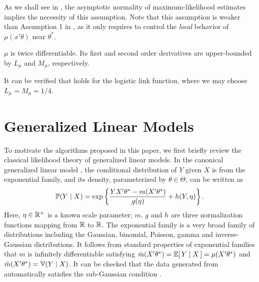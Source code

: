 As we shall see in , the asymptotic normality of maximum-likelihood estimates implies the necessity of this assumption. Note that this assumption is weaker than Assumption 1 in \citet{filippi2010parametric}, as it only requires to control the \emph{local} behavior of $\dot{\mu}(x'\theta)$ near $\theta^*$. 

\begin{assumption} \label{ass:smooth}
$\mu$ is twice differentiable. Its first and second order derivatives are upper-bounded by $L_{\mu}$ and $M_\mu$, respectively.
\end{assumption}

It can be verified that  holds for the logistic link function, where we may choose $L_{\mu}=M_\mu=1/4$.

\section{Generalized Linear Models} \label{sec:glm}

To motivate the algorithms proposed in this paper, we first briefly review the classical likelihood theory of generalized linear models. In the canonical generalized linear model \cite{mccullagh1989generalized}, the conditional distribution of $Y$ given $X$ is from the exponential family, and its density, parameterized by $\theta\in\Theta$, can be written as
\begin{equation}
\mathbb{P}(Y \mid X) = \exp\left \{\frac{Y X'\theta^* - m(X'\theta^*)}{g(\eta)} + h(Y,\eta) \right\}. \label{eq:glm1}
\end{equation}
Here, $\eta \in \mathbb{R}^+$ is a known scale parameter; $m$, $g$ and $h$ are three normalization functions mapping from $\mathbb{R}$ to $\mathbb{R}$. The exponential family  is a very broad family of distributions including the Gaussian, binomial, Poisson, gamma and inverse-Gaussian distributions. It follows from standard properties of exponential families \cite{brown1986fundamentals} that $m$ is infinitely differentiable satisfying $\dot{m}(X'\theta^*)=\mathbb{E} [\,Y \mid X\,] = \mu(X'\theta^*)$ and $\ddot{m}(X'\theta^*)=\mathbb{V}(Y \mid X)$. It can be checked that the data generated from  automatically satisfies the sub-Gaussian condition .

